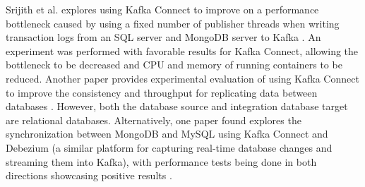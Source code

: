 Srijith et al. explores using Kafka Connect to improve on a performance bottleneck caused by using a fixed number of publisher threads when writing transaction logs from an SQL server and MongoDB server to Kafka \cite{srijithkafkaconnectperformance}. An experiment was performed with favorable results for Kafka Connect, allowing the bottleneck to be decreased and \ac{CPU} and memory of running containers to be reduced. Another paper provides experimental evaluation of using Kafka Connect to improve the consistency and throughput for replicating data between databases \cite{adilaoptimizationkafkaconnect}. However, both the database source and integration database target are relational databases. Alternatively, one paper found explores the synchronization between MongoDB and MySQL using Kafka Connect and Debezium (a similar platform for capturing real-time database changes and streaming them into Kafka), with performance tests being done in both directions showcasing positive results \cite{sqlmongosync}.

